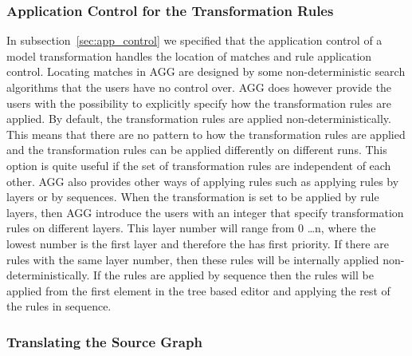 \subsubsection*{Application Control for the Transformation Rules}

In subsection~\ref{sec:app_control} we specified that the application control of
a model transformation handles the location of matches and rule application
control. Locating matches in AGG are designed by some non-deterministic search
algorithms that the users have no control over. AGG does however provide the
users with the possibility to explicitly specify how the transformation rules
are applied. By default, the transformation rules are applied
non-deterministically. This means that there are no pattern to how the
transformation rules are applied and the transformation rules can be applied
differently on different runs. This option is quite useful if the set of
transformation rules are independent of each other. AGG also provides other
ways of applying rules such as applying rules by layers or by sequences. When
the transformation is set to be applied by rule layers, then AGG introduce
the users with an integer that specify transformation rules on different layers.
This layer number will range from 0 \ldots n, where the lowest number is the
first layer and therefore the has first priority. If there are rules with
the same layer number, then these rules will be internally applied
non-deterministically. If the rules are applied by sequence then the rules will
be applied from the first element in the tree based editor and applying the rest
of the rules in sequence.

\subsubsection*{Translating the Source Graph}

